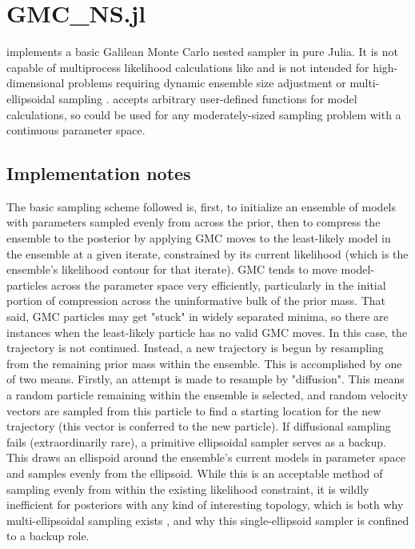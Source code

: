 \chapter{GMC\_NS.jl}
\label{ch:GMC}
 implements a basic Galilean Monte Carlo nested sampler \cite{Skilling2012} in pure Julia. It is not capable of multiprocess likelihood calculations like  and is not intended for high-dimensional problems requiring dynamic ensemble size adjustment \cite{Higson2019} or multi-ellipsoidal sampling \cite{Feroz2009}.  accepts arbitrary user-defined functions for model calculations, so could be used for any moderately-sized sampling problem with a continuous parameter space.

\section{Implementation notes}

The basic sampling scheme followed is, first, to initialize an ensemble of models with parameters sampled evenly from across the prior, then to compress the ensemble to the posterior by applying GMC moves to the least-likely model in the ensemble at a given iterate, constrained by its current likelihood (which is the ensemble's likelihood contour for that iterate). GMC tends to move model-particles across the parameter space very efficiently, particularly in the initial portion of compression across the uninformative bulk of the prior mass. That said, GMC particles may get "stuck" in widely separated minima, so there are instances when the least-likely particle has no valid GMC moves. In this case, the trajectory is not continued. Instead, a new trajectory is begun by resampling from the remaining prior mass within the ensemble. This is accomplished by one of two means. Firstly, an attempt is made to resample by "diffusion". This means a random particle remaining within the ensemble is selected, and random velocity vectors are sampled from this particle to find a starting location for the new trajectory (this vector is conferred to the new particle). If diffusional sampling fails (extraordinarily rare), a primitive ellipsoidal sampler serves as a backup. This draws an ellispoid around the ensemble's current models in parameter space and samples evenly from the ellipsoid. While this is an acceptable method of sampling evenly from within the existing likelihood constraint, it is wildly inefficient for posteriors with any kind of interesting topology, which is both why multi-ellipsoidal sampling exists \cite{Feroz2009}, and why this single-ellipsoid sampler is confined to a backup role.

